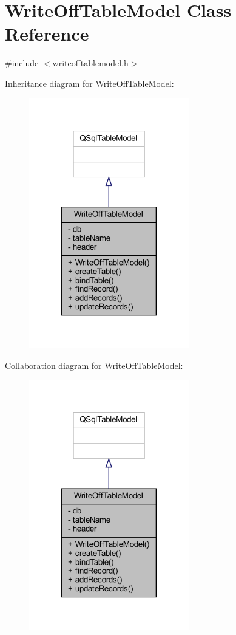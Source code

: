 \hypertarget{class_write_off_table_model}{}\section{Write\+Off\+Table\+Model Class Reference}
\label{class_write_off_table_model}


{\ttfamily \#include $<$writeofftablemodel.\+h$>$}



Inheritance diagram for Write\+Off\+Table\+Model\+:
\nopagebreak
\begin{figure}[H]
\begin{center}
\leavevmode
\includegraphics[width=197pt]{class_write_off_table_model__inherit__graph}
\end{center}
\end{figure}


Collaboration diagram for Write\+Off\+Table\+Model\+:
\nopagebreak
\begin{figure}[H]
\begin{center}
\leavevmode
\includegraphics[width=197pt]{class_write_off_table_model__coll__graph}
\end{center}
\end{figure}

